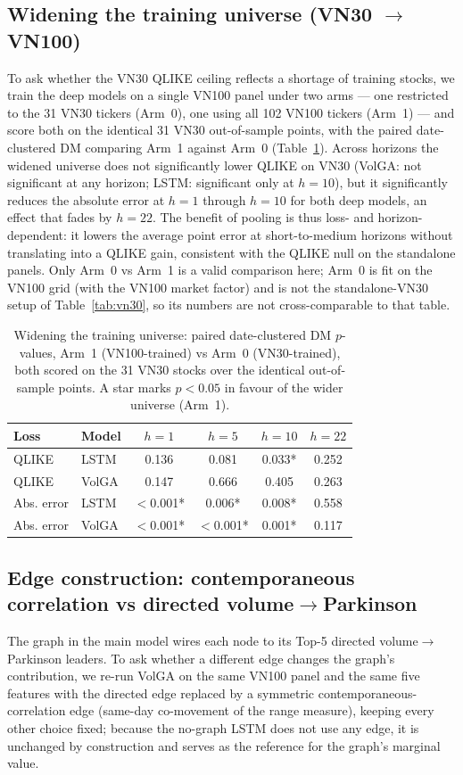 \documentclass[runningheads]{llncs}
\begin{document}
\subsection{Widening the training universe (VN30 $\to$ VN100)}\label{sec:pool}
To ask whether the VN30 QLIKE ceiling reflects a shortage of training stocks, we train the deep
models on a single VN100 panel under two arms --- one restricted to the 31 VN30 tickers (Arm~0),
one using all 102 VN100 tickers (Arm~1) --- and score both on the identical 31 VN30 out-of-sample
points, with the paired date-clustered DM comparing Arm~1 against Arm~0 (Table~\ref{tab:pool}).
Across horizons the widened universe does not significantly lower QLIKE on VN30 (VolGA: not
significant at any horizon; LSTM: significant only at $h{=}10$), but it significantly reduces the
absolute error at $h{=}1$ through $h{=}10$ for both deep models, an effect that fades by $h{=}22$.
The benefit of pooling is thus loss- and horizon-dependent: it lowers the average point error at
short-to-medium horizons without translating into a QLIKE gain, consistent with the QLIKE null on
the standalone panels. Only Arm~0 vs Arm~1 is a valid comparison here; Arm~0 is fit on the VN100
grid (with the VN100 market factor) and is not the standalone-VN30 setup of Table~\ref{tab:vn30},
so its numbers are not cross-comparable to that table.

\begin{table}[h]\centering
\caption{Widening the training universe: paired date-clustered DM $p$-values, Arm~1 (VN100-trained)
vs Arm~0 (VN30-trained), both scored on the 31 VN30 stocks over the identical out-of-sample points.
A star marks $p<0.05$ in favour of the wider universe (Arm~1).}\label{tab:pool}
\begin{tabular}{llcccc}
\toprule
Loss & Model & $h{=}1$ & $h{=}5$ & $h{=}10$ & $h{=}22$ \\
\midrule
QLIKE & LSTM & 0.136 & 0.081 & 0.033* & 0.252 \\
QLIKE & VolGA & 0.147 & 0.666 & 0.405 & 0.263 \\
Abs. error & LSTM & $<$0.001* & 0.006* & 0.008* & 0.558 \\
Abs. error & VolGA & $<$0.001* & $<$0.001* & 0.001* & 0.117 \\
\bottomrule
\end{tabular}
\end{table}

\subsection{Edge construction: contemporaneous correlation vs directed volume$\to$Parkinson}\label{sec:edge}
The graph in the main model wires each node to its Top-5 directed volume$\to$Parkinson leaders. To
ask whether a different edge changes the graph's contribution, we re-run VolGA on the same VN100
panel and the same five features with the directed edge replaced by a symmetric
contemporaneous-correlation edge (same-day co-movement of the range measure), keeping every other
choice fixed; because the no-graph LSTM does not use any edge, it is unchanged by construction and
serves as the reference for the graph's marginal value.
\end{document}
